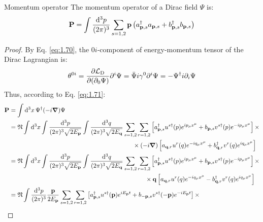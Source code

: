 \begin{proposition}{Momentum operator}{}
  The momentum operator of a Dirac field $ \Psi $ is:
  \begin{equation}
    \mathbf{P} = \int \frac{\mathrm{d}^3p}{(2\pi)^3} \sum_{s = 1,2} \mathbf{p} \left( a_{\mathbf{p},s}^\dagger a_{\mathbf{p},s} + b_{\mathbf{p},s}^\dagger b_{\mathbf{p},s} \right)
    \label{eq:2.24}
  \end{equation}

  \tcblower

  \begin{proof}
    By Eq. \ref{eq:1.70}, the $ 0i $-component of energy-momentum tensor of the Dirac Lagrangian is:
    \begin{equation*}
      \theta^{0i} = \frac{\partial \mathcal{L}_\text{D}}{\partial (\partial_0 \Psi)} \partial^i \Psi = \bar{\Psi} i \gamma^0 \partial^i \Psi = - \Psi^\dagger i \partial_i \Psi
    \end{equation*}
    Thus, according to Eq. \ref{eq:1.71}:
    \begin{equation*}
      \begin{split}
        \ve{P}
        &= \int \dd^3x\, \Psi^\dagger (-i \bs{\nabla}) \Psi \\
        &= \mathfrak{N} \int \dd^3x \int \frac{\dd^3p}{(2\pi)^3 \sqrt{2E_\ve{p}}} \int \frac{\dd^3q}{(2\pi)^3 \sqrt{2E_\ve{q}}} \sum_{s = 1,2} \sum_{r = 1,2} \left[ a_{\ve{p},s}^\dagger u^{s\dagger}(p) e^{i p_\mu x^\mu} + b_{\ve{p},s} v^{s\dagger}(p) e^{-ip_\mu x^\mu} \right] \times \\
        & \qquad \qquad \qquad \qquad \qquad \qquad \qquad \qquad \qquad \qquad \times (-i \bs{\nabla}) \left[ a_{\ve{q},r} u^r(q) e^{-i q_\mu x^\mu} + b_{\ve{q},r}^\dagger v^r(q) e^{i q_\mu x^\mu} \right] \\
        &= \mathfrak{N} \int \dd^3x \int \frac{\dd^3p}{(2\pi)^3 \sqrt{2E_\ve{p}}} \int \frac{\dd^3q}{(2\pi)^3 \sqrt{2E_\ve{q}}} \sum_{s = 1,2} \sum_{r = 1,2} \left[ a_{\ve{p},s}^\dagger u^{s\dagger}(p) e^{i p_\mu x^\mu} + b_{\ve{p},s} v^{s\dagger}(p) e^{-ip_\mu x^\mu} \right] \times \\
        & \qquad \qquad \qquad \qquad \qquad \qquad \qquad \qquad \qquad \qquad \qquad \times \ve{q} \left[ a_{\ve{q},r} u^r(q) e^{-i q_\mu x^\mu} - b_{\ve{q},r}^\dagger v^r(q) e^{i q_\mu x^\mu} \right] \\
        &= \mathfrak{N} \int \frac{\dd^3p}{(2\pi)^3} \frac{\ve{p}}{2E_\ve{p}} \sum_{s = 1,2} \sum_{r = 1,2} \left[ a_{\ve{p},s}^\dagger u^{s\dagger}(\ve{p}) e^{i E_\ve{p} t} + b_{-\ve{p},s} v^{s\dagger}(-\ve{p}) e^{-i E_\ve{p} t} \right] \times \\

\end{split}
\end{equation*}
\end{proof}
\end{proposition}

